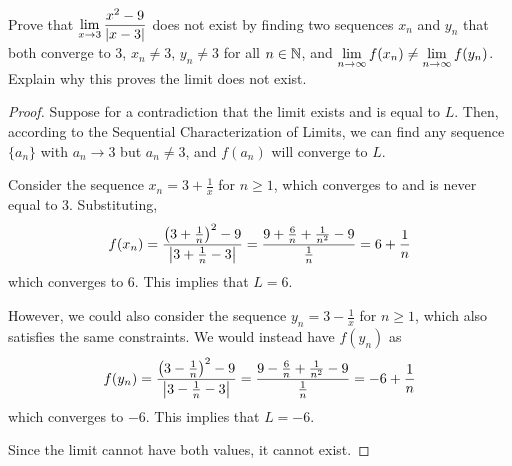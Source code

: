 \documentclass{agony}
\begin{document}
\question Prove that $\lim\limits_{x\to3} \dfrac{x^2-9}{|x-3|}$ does not exist
by finding two sequences $x_n$ and $y_n$ that both converge to 3,
$x_n \neq 3$, $y_n \neq 3$ for all $n\in\mathbb{N}$,
and $\lim\limits_{n\to\infty} f(x_n) \neq \lim\limits_{n\to\infty} f(y_n)$.
Explain why this proves the limit does not exist.
\begin{proof}
  Suppose for a contradiction that the limit exists and is equal to $L$.
  Then, according to the Sequential Characterization of Limits,
  we can find any sequence $\{a_n\}$ with $a_n \to 3$ but $a_n \neq 3$, and $f(a_n)$ will converge to $L$.

  Consider the sequence $x_n = 3+\frac{1}{x}$ for $n \geq 1$, which converges to and is never equal to 3.
  Substituting,
  \begin{equation*}
    f(x_n) = \frac{\left(3+\frac{1}{n}\right)^2 - 9}{\abs{3+\frac{1}{n}-3}}
    = \frac{9+\frac{6}{n}+\frac{1}{n^2} - 9}{\frac{1}{n}}
    = 6+\frac{1}{n}
  \end{equation*}
  which converges to 6.
  This implies that $L = 6$.

  However, we could also consider the sequence $y_n = 3-\frac{1}{x}$ for $n \geq 1$, which also satisfies the same constraints.
  We would instead have $f(y_n)$ as
  \begin{equation*}
    f(y_n) = \frac{\left(3-\frac{1}{n}\right)^2 - 9}{\abs{3-\frac{1}{n}-3}}
    = \frac{9-\frac{6}{n}+\frac{1}{n^2} - 9}{\frac{1}{n}}
    = -6+\frac{1}{n}
  \end{equation*}
  which converges to $-6$.
  This implies that $L = -6$.

  Since the limit cannot have both values, it cannot exist.
\end{proof}
\end{document}
